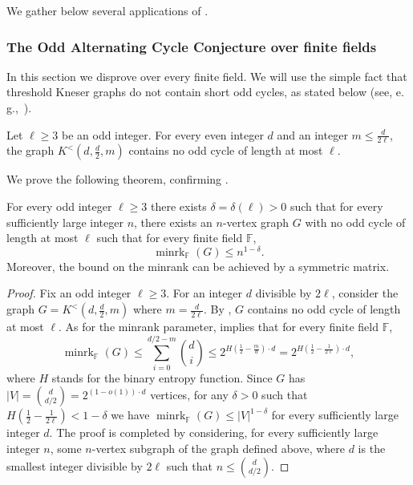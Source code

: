 \documentclass{toc}
\newcommand{\Fset}{\mathbb{F}}
\newcommand{\minrank}{\mathop{\mathrm{minrk}}}
\newcommand\Kneser[3]{K^<(#1,#2,#3)}
\begin{document}
We gather below several applications of .

\subsubsection{The Odd Alternating Cycle Conjecture over finite fields}

%
In this section we disprove %
 over every finite field.
We will use the simple fact that
%
threshold Kneser graphs   %
do not contain short odd cycles, as stated below (see, e.\,g.,~\cite{Denley97,Haviv18free}).

\begin{lemma}\label{lemma:cycle_K}
Let $\ell \geq 3$ be an odd integer.
For every even integer $d$ and an integer $m \leq \frac{d}{2\ell}$, the graph $\Kneser{d}{\frac{d}{2}}{m}$ contains no odd cycle of length at most $\ell$.
\end{lemma}

We prove the following theorem, confirming .

\begin{theorem}\label{thm:Cycles}
For every odd integer $\ell \geq 3$ there exists $\delta = \delta(\ell) >0$ such that for every sufficiently large integer $n$, there exists an $n$-vertex graph $G$ with no odd cycle of length at most $\ell$ such that for every finite field $\Fset$,
\[{\minrank}_{\Fset}(G) \leq n^{1-\delta}.\]
Moreover, the bound on the minrank can be achieved by a symmetric matrix.
\end{theorem}

\begin{proof}
Fix an odd integer $\ell \geq 3$.
For an integer $d$ divisible by $2 \ell$, consider the graph $G = \Kneser{d}{\frac{d}{2}}{m}$ where $m = \frac{d}{2 \ell}$.
By , $G$ contains no odd cycle of length at most $\ell$.
As for the minrank parameter,  implies that for every finite field $\Fset$,
\[{\minrank}_{\Fset}(G) \leq \sum_{i=0}^{d/2-m}\binom{d}{i} \leq 2^{H(\frac{1}{2}-\frac{m}{d}) \cdot d} = 2^{H(\frac{1}{2}-\frac{1}{2\ell}) \cdot d},\]
where $H$ stands for the binary entropy function.
Since $G$ has $|V| = \binom{d}{d/2} = 2^{(1-o(1)) \cdot d}$ vertices, for any $\delta>0$ such that $H(\frac{1}{2}-\frac{1}{2\ell}) < 1-\delta$ we have ${\minrank}_{\Fset}(G) \leq |V|^{1-\delta}$ for every sufficiently large integer $d$.
The proof is completed by considering, for every sufficiently large integer $n$, some $n$-vertex subgraph of the graph defined above, where $d$ is the smallest integer divisible by $2\ell$ such that $n \leq \binom{d}{d/2}$.
\end{proof}
\end{document}
